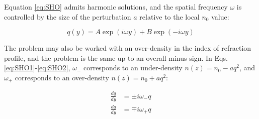 \documentclass[12pt]{article}
\begin{document}
Equation \ref{eq:SHO} admits harmonic solutions, and the spatial frequency $\omega$ is controlled by the size of the perturbation $a$ relative to the local $n_0$ value:

\begin{equation}
q(y) = A\exp(i\omega y) + B\exp(-i\omega y)
\end{equation}

The problem may also be worked with an over-density in the index of refraction profile, and the problem is the same up to an overall minus sign.  In Eqs. \ref{eq:SHO1}-\ref{eq:SHO2}, $\omega_{-}$ corresponds to an under-density $n(z) = n_0 - aq^2$, and $\omega_{+}$ corresponds to an over-density $n(z) = n_0 + aq^2$:

\begin{align}
\frac{dq}{dy} &= \pm i\omega_{-} q \label{eq:SHO1} \\
\frac{dq}{dy} &= \mp i\omega_{+} q \label{eq:SHO2}
\end{align}
\end{document}
